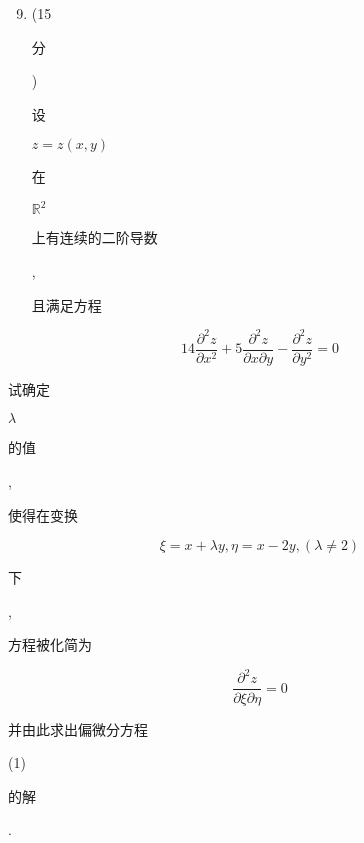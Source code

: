 \documentclass[10pt]{article}
\begin{document}
\begin{enumerate}
  \setcounter{enumi}{8}
  \item (15 \begin{CJK}{UTF8}{mj}分\end{CJK}) \begin{CJK}{UTF8}{mj}设\end{CJK} $z=z(x, y)$ \begin{CJK}{UTF8}{mj}在\end{CJK} $\mathbb{R}^{2}$ \begin{CJK}{UTF8}{mj}上有连续的二阶导数\end{CJK}, \begin{CJK}{UTF8}{mj}且满足方程\end{CJK}
\end{enumerate}
$$
14 \frac{\partial^{2} z}{\partial x^{2}}+5 \frac{\partial^{2} z}{\partial x \partial y}-\frac{\partial^{2} z}{\partial y^{2}}=0
$$
\begin{CJK}{UTF8}{mj}试确定\end{CJK} $\lambda$ \begin{CJK}{UTF8}{mj}的值\end{CJK}, \begin{CJK}{UTF8}{mj}使得在变换\end{CJK}
$$
\xi=x+\lambda y, \eta=x-2 y,(\lambda \neq 2)
$$
\begin{CJK}{UTF8}{mj}下\end{CJK}, \begin{CJK}{UTF8}{mj}方程被化简为\end{CJK}
$$
\frac{\partial^{2} z}{\partial \xi \partial \eta}=0
$$
\begin{CJK}{UTF8}{mj}并由此求出偏微分方程\end{CJK} (1) \begin{CJK}{UTF8}{mj}的解\end{CJK}.
\end{document}
